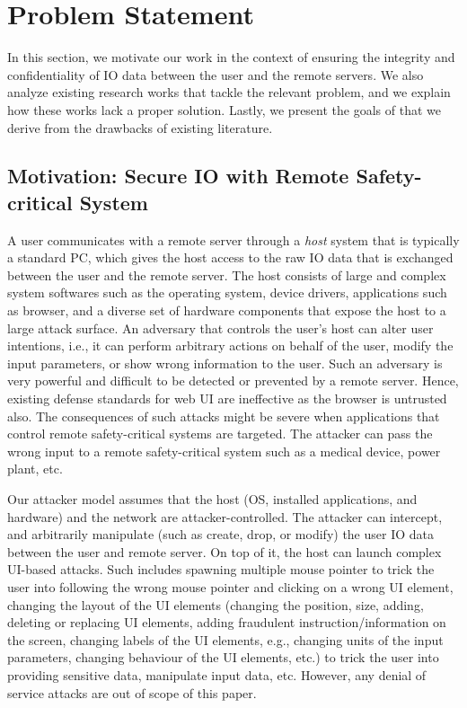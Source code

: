 \section{Problem Statement}
\label{sec:problemStatement}

In this section, we motivate our work in the context of ensuring the integrity and confidentiality of IO data between the user and the remote servers. We also analyze existing research works that tackle the relevant problem, and we explain how these works lack a proper solution. Lastly, we present the goals of \name that we derive from the drawbacks of existing literature.

\subsection{Motivation: Secure IO with Remote Safety-critical System}

A user communicates with a remote server through a \emph{host} system that is typically a standard PC, which gives the host access to the raw IO data that is exchanged between the user and the remote server. The host consists of large and complex system softwares such as the operating system, device drivers, applications such as browser, and a diverse set of hardware components that expose the host to a large attack surface. An adversary that controls the user's host can alter user intentions, i.e., it can perform arbitrary actions on behalf of the user, modify the input parameters, or show wrong information to the user. Such an adversary is very powerful and difficult to be detected or prevented by a remote server. Hence, existing defense standards for web UI are ineffective as the browser is untrusted also. The consequences of such attacks might be severe when applications that control remote safety-critical systems are targeted. The attacker can pass the wrong input to a remote safety-critical system such as a medical device, power plant, etc.

 Our attacker model assumes that the host (OS, installed applications, and hardware) and the network are attacker-controlled. The attacker can intercept, and arbitrarily manipulate (such as create, drop, or modify) the user IO data between the user and remote server. On top of it, the host can launch complex UI-based attacks. Such includes spawning multiple mouse pointer to trick the user into following the wrong mouse pointer and clicking on a wrong UI element, changing the layout of the UI elements (changing the position, size, adding, deleting or replacing UI elements, adding fraudulent instruction/information on the screen, changing labels of the UI elements, e.g., changing units of the input parameters, changing behaviour of the UI elements, etc.) to trick the user into providing sensitive data, manipulate input data, etc. However, any denial of service attacks are out of scope of this paper.

